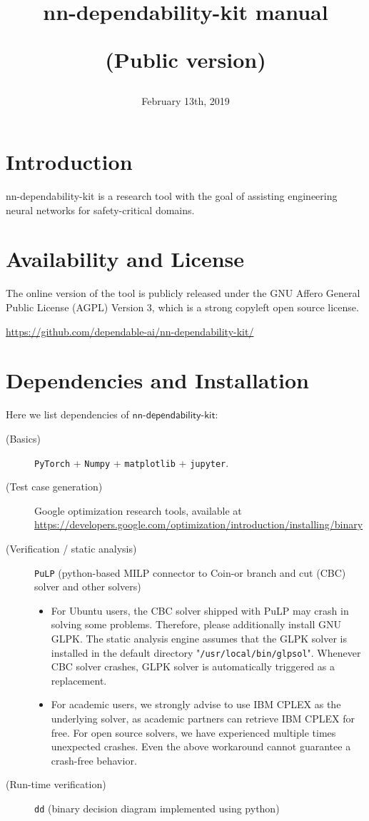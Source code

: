 \documentclass{article}
\title{\textsf{nn-dependability-kit} manual \\ \begin{large}(Public version)\end{large}}
\date{February 13th, 2019}
\begin{document}
\maketitle

\section{Introduction}

\textsf{nn-dependability-kit} is a research tool with the goal of assisting engineering neural networks for safety-critical domains. 


\section{Availability and License}

The online version of the tool is publicly released under the GNU Affero General Public License (AGPL) Version 3, which is a strong copyleft open source license. 

\vspace{5mm}

\url{https://github.com/dependable-ai/nn-dependability-kit/}



\section{Dependencies and Installation}

Here we list dependencies of $\textsf{nn-dependability-kit}$:
\begin{description}
\item[(Basics)] \texttt{PyTorch} + \texttt{Numpy} + \texttt{matplotlib} + \texttt{jupyter}. 
\item[(Test case generation)] Google optimization research tools, available at \\ {\small\url{https://developers.google.com/optimization/introduction/installing/binary}}

\item[(Verification / static analysis)] \texttt{PuLP} (python-based MILP connector to Coin-or branch and cut (CBC) solver and other solvers)
\begin{itemize}
    \item For Ubuntu users, the CBC solver shipped with PuLP may crash in solving some problems. Therefore, please additionally install GNU GLPK. The static analysis engine assumes that the GLPK solver is installed in the default directory "\texttt{/usr/local/bin/glpsol}". Whenever CBC solver crashes, GLPK solver is automatically triggered as a replacement.
    \item For academic users, we strongly advise to use IBM CPLEX as the underlying solver, as academic partners can retrieve IBM CPLEX for free. For open source solvers, we have experienced multiple times unexpected crashes. Even the above workaround cannot guarantee a crash-free behavior. 
\end{itemize}
\item[(Run-time verification)] \texttt{dd} (binary decision diagram implemented using python)
\end{description}
\end{document}
